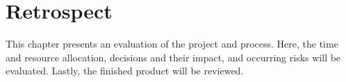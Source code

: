 \chapter{Retrospect}
This chapter presents an evaluation of the project and process. Here, the time and resource allocation, decisions and their impact, and occurring risks will be evaluated. Lastly, the finished product will be reviewed.





